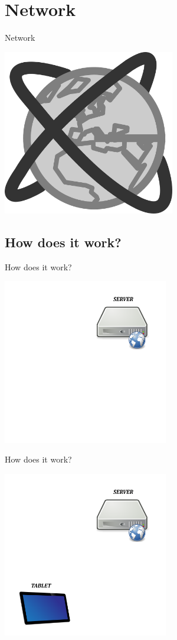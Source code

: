 \documentclass[a4paper,10pt]{beamer}
\begin{document}
	\section{Network}
		
		\begin{frame}{Network}
			\centerline{\includegraphics[height=205pt]{images/network/network.png}}
		\end{frame}
		
		\subsection{How does it work?}
		
			\begin{frame}{How does it work?}
				\centerline{\includegraphics[height=205pt]{images/network/server.png}}
			\end{frame}
		
			\begin{frame}{How does it work?}
				\centerline{\includegraphics[height=205pt]{images/network/tabletandserver.png}}
			\end{frame}
		
\end{document}
